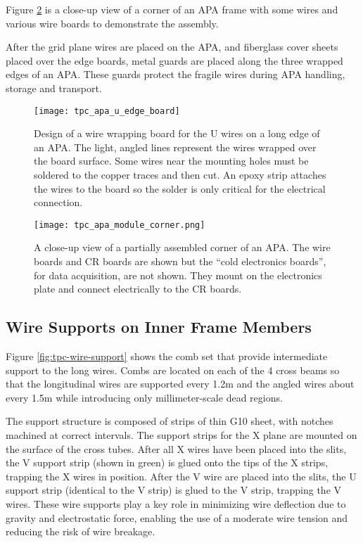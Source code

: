 Figure \ref{fig:tpc-APA-corner} is a close-up view of a corner of an APA frame with some wires and various wire boards to demonstrate the assembly.

After the grid plane wires are placed on the APA, and fiberglass cover sheets placed over the edge boards, metal guards are placed along the three wrapped edges of an APA. These guards protect the fragile wires during APA handling, storage and transport.



\begin{figure}[htpb]
\centering
\texttt{[image: tpc\_apa\_u\_edge\_board]}
\caption{Design of a wire wrapping board for the U wires on a long edge of an APA. The light, angled lines represent the wires wrapped over the board surface. Some wires near the mounting holes must be soldered to the copper traces and then cut.  An epoxy strip attaches the wires to the board so the solder is only critical for the electrical connection.}
\label{fig:tpc-wire-board-u-side}
\end{figure}

\begin{figure}[htbp]
\centering
\texttt{[image: tpc\_apa\_module\_corner.png]}
\caption[Closeup view of a partially assembled corner of an APA]{A close-up view of a partially assembled corner of an APA.  The wire boards and CR boards are shown but the ``cold electronics boards'', for data acquisition, are not shown.  They mount on the electronics plate and connect electrically to the CR boards. }
\label{fig:tpc-APA-corner}
\end{figure}

\subsection{Wire Supports on Inner Frame Members}

Figure \ref{fig:tpc-wire-support} shows the comb set that provide intermediate support to the long wires.  Combs are located on each of the 4 cross beams so that the longitudinal wires are supported every 1.2m and the angled wires about every 1.5m while introducing only millimeter-scale dead regions.

The support structure is composed of strips of thin G10 sheet, with notches machined at correct intervals. The support strips for the X plane are mounted on the surface of the cross tubes.  After all X wires have been placed into the slits, the V support strip (shown in green) is glued onto the tips of the X strips, trapping the X wires in position.  After the V wire are placed into the slits, the U support strip (identical to the V strip) is glued to the V strip, trapping the V wires.  These wire supports play a key role in minimizing wire deflection due to gravity and electrostatic force, enabling the use of a moderate wire tension and reducing the risk of wire breakage.



